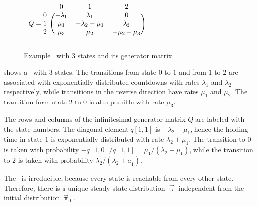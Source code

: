 \begin{figure}
  \begin{minipage}{.49\linewidth}
    \centering
  \end{minipage}
  \begin{minipage}{.49\linewidth}
    \centering
    $\begin{blockarray}{rccc}
      & 0 & 1 & 2 \\
      \begin{block}{r(ccc)}
        0 & -\lambda_1 & \lambda_1 & 0 \\
        Q = 1 & \mu_1 & -\lambda_2 - \mu_1 & \lambda_2 \\
        2 & \mu_3 & \mu_2 & -\mu_2 - \mu_3 \\
      \end{block}
    \end{blockarray}$
    \vspace{0.5cm}
  \end{minipage}
  \caption{Example \CTMC\ with 3 states and its generator matrix.}
  \label{fig:background:ctmc:repair}
\end{figure}

\begin{example}
   shows a \CTMC\ with $3$
  states. The transitions from state $0$ to $1$ and from $1$ to $2$
  are associated with exponentially distributed countdowns with rates
  $\lambda_1$ and $\lambda_2$ respectively, while transitions in the
  reverse direction have rates $\mu_1$ and $\mu_2$. The transition
  form state $2$ to $0$ is also possible with rate $\mu_3$.
  
  The rows  and
  columns  of the infinitesimal generator
  matrix $Q$ are labeled with the state numbers. The diagonal element
  $q[1, 1]$ is $-\lambda_2 - \mu_1$, hence the holding time in state
  $1$ is exponentially distributed with rate $\lambda_2 + \mu_1$. The
  transition to $0$ is taken with probability
  $-q[1, 0] / q[1, 1] = \mu_1 / (\lambda_2 + \mu_1)$, while the
  transition to $2$ is taken with probability
  $\lambda_2 / (\lambda_2 + \mu_1)$.

  The \CTMC\ is irreducible, because every state is reachable from
  every other state. Therefore, there is a unique steady-state
  distribution $\vec{\uppi}$ independent from the initial distribution
  $\vec{\uppi}_0$.
\end{example}

